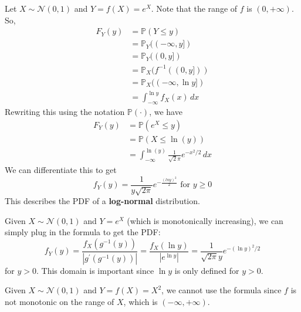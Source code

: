   \begin{example}
    \label{ex:log-normal-distribution}
    Let $X \sim \mathcal{N}(0, 1)$ and $Y = f(X) = e^X$. Note that the range of $f$ is $(0, +\infty)$. So, 
    \begin{align*}
      F_Y (y) & = \mathbb{P}(Y \leq y) \\
      & = \mathbb{P}_Y ((-\infty, y]) \\
      & = \mathbb{P}_Y ( (0, y]) \\ 
      & = \mathbb{P}_X ( f^{-1} ((0, y]) ) \\
      & = \mathbb{P}_X ( (-\infty, \ln{y}] ) \\
      & = \int_{-\infty}^{\ln{y}} f_X (x)\,dx 
    \end{align*}
    Rewriting this using the notation $\mathbb{P}(\cdot)$, we have 
    \begin{align*}
      F_Y (y) & = \mathbb{P}(e^X \leq y) \\
      & = \mathbb{P}(X \leq \ln(y)) \\ 
      & = \int_{-\infty}^{\ln(y)} \frac{1}{\sqrt{2} \pi} e^{-x^2/ 2} \,dx 
    \end{align*}
    We can differentiate this to get 
    \begin{equation}
      f_Y (y) = \frac{1}{y \sqrt{2 \pi}} e^{-\frac{(ln{y})^2}{2}} \text{ for } y \geq 0
    \end{equation}
    This describes the PDF of a \textbf{log-normal} distribution. 
  \end{example}

  \begin{example}
    \label{ex:log-normal-revisited}
    Given $X \sim \mathcal{N}(0, 1)$ and $Y = e^X$ (which is monotonically increasing), we can simply plug in the formula to get the PDF: 
    \begin{equation}
      f_Y (y) = \frac{f_X (g^{-1} (y) )}{|g^\prime (g^{-1} (y))|} = \frac{f_X (\ln{y}) }{ | e^{\ln{y}} |} = \frac{1}{\sqrt{2 \pi} y} e^{-(\ln{y})^2 / 2}
    \end{equation}
    for $y > 0$. This domain is important since $\ln{y}$ is only defined for $y > 0$. 
  \end{example}

  \begin{example}
    \label{ex:non-monotone-transformation-of-a-gaussian}
    Given $X \sim \mathcal{N}(0, 1)$ and $Y = f(X) = X^2$, we cannot use the formula since $f$ is not monotonic on the range of $X$, which is $(-\infty, +\infty)$.  
  \end{example}

